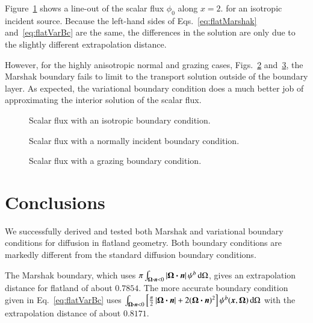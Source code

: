 \documentclass{anstrans}
\begin{document}
Figure~\ref{fig:isotropic} shows a line-out of the scalar flux $\phi_0$ along
$x=2.$ for an isotropic incident source. Because the left-hand sides of
Eqs.~\eqref{eq:flatMarshak} and~\eqref{eq:flatVarBc} are the same, the
differences in the solution are only due to the slightly different
extrapolation distance.

However, for the highly anisotropic normal and grazing cases,
Figs.~\ref{fig:delta} and~\ref{fig:grazing}, the Marshak boundary fails to
limit to the transport solution outside of the boundary layer. As
expected, the variational boundary condition does a much better job of
approximating the interior solution of the scalar flux.


\begin{figure}[htb!]
  \centering
  \hspace{-.5in}
  
  \hspace{-.5in}
  \caption{Scalar flux with an isotropic boundary condition.}
  \label{fig:isotropic}
\end{figure}

\begin{figure}[htb!]
  \centering
  \hspace{-.5in}
  
  \hspace{-.5in}
  \caption{Scalar flux with a normally incident boundary condition.}
  \label{fig:delta}
\end{figure}

\begin{figure}[htb!]
  \centering
  \hspace{-.5in}
  
  \hspace{-.5in}
  \caption{Scalar flux with a grazing boundary condition.}
  \label{fig:grazing}
\end{figure}

\section{Conclusions}
We successfully derived and tested both Marshak and variational boundary
conditions for diffusion in flatland geometry. Both boundary conditions are
markedly different from the standard diffusion boundary conditions.

The Marshak boundary, which uses $\pi \int_{\bm{\Omega}\bm{\cdot} \bm{n} < 0 }
\left| \bm{\Omega}\bm{\cdot} \bm{n} \right| \psi^b \mathop{}\!\mathrm{d}\Omega$, gives an extrapolation
distance for flatland of about $0.7854$.
The more accurate boundary condition given in Eq.~\eqref{eq:flatVarBc} uses 
$\int_{\bm{\Omega}\bm{\cdot}\bm{n} < 0} \left[ \frac{\pi}{2}
\left| \bm{\Omega}\bm{\cdot}\bm{n} \right| + 2 (\bm{\Omega}\bm{\cdot}\bm{n})^2 \right]
\psi^b(\bm{x}, \bm{\Omega}) \mathop{}\!\mathrm{d}\Omega$ with the extrapolation distance of
about $0.8171$.



\end{document}
